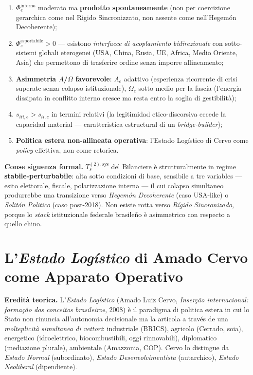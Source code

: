 \begin{enumerate}
\def\labelenumi{\arabic{enumi}.}
\tightlist
\item
  \(\Phi_e^{\text{interno}}\) moderato ma \textbf{prodotto
  spontaneamente} (non per coercizione gerarchica come nel Rigido
  Sincronizzato, non assente come nell'Hegemón Decoherente);
\item
  \(\Phi_e^{\text{esportabile}} > 0\) --- esistono \emph{interfacce di
  acoplamiento bidirezionale} con sotto-sistemi globali eterogenei
  (USA, China, Rusia, UE, Africa, Medio Oriente, Asia) che permettono di
  trasferire ordine senza imporre allineamento;
\item
  \textbf{Asimmetria \(A\)/\(\Omega\) favorevole}: \(A_e\) adattivo
  (esperienza ricorrente di crisi superate senza colapso
  istituzionale), \(\Omega_e\) sotto-medio per la fascia (l'energia
  dissipata in conflitto interno cresce ma resta entro la soglia di
  gestibilità);
\item
  \(s_{iii,e} > s_{ii,e}\) in termini relativi (la legitimidad
  etico-discorsiva eccede la capacidad material --- caratteristica
  estructural di un \emph{bridge-builder});
\item
  \textbf{Politica estera non-allineata operativa}: l'Estado Logístico
  di Cervo come \emph{policy} effettiva, non come retorica.
\end{enumerate}

\Proved{} \textbf{Conse siguenza formal.} \(T_s^{(2),\text{sys}}\) del
Bilanciere è strutturalmente in regime \textbf{stabile-perturbabile}:
alta sotto condizioni di base, sensibile a tre variables --- esito
elettorale, fiscale, polarizzazione interna --- il cui colapso
simultaneo produrrebbe una transizione verso \emph{Hegemón Decoherente}
(caso USA-like) o \emph{Solitón Politico} (caso post-2018). Non esiste
rotta verso \emph{Rígido Sincronizado}, porque lo \emph{stack}
istituzionale federale brasileño è asimmetrico con respecto a quello
chino.



\section{\texorpdfstring{L'\emph{Estado Logístico} di Amado Cervo come
Apparato
Operativo}{L'Estado Logístico di Amado Cervo come Apparato Operativo}}\label{lestado-loguxedstico-di-amado-cervo-come-apparato-operativo}

\Hypoth{} \textbf{Eredità teorica.} L'\emph{Estado Logístico} (Amado
Luiz Cervo, \emph{Inserção internacional: formação dos conceitos
brasileiros}, 2008) è il paradigma di politica estera in cui lo Stato
non rinuncia all'autonomia decisionale ma la articola a través de una
\emph{molteplicità simultanea di vettori}: industriale (BRICS), agricolo
(Cerrado, soia), energetico (idroelettrico, biocombustibili, oggi
rinnovabili), diplomatico (mediazione plurale), ambientale (Amazzonia,
COP). Cervo lo distingue da \emph{Estado Normal} (subordinato),
\emph{Estado Desenvolvimentista} (autarchico), \emph{Estado Neoliberal}
(dipendiente).

